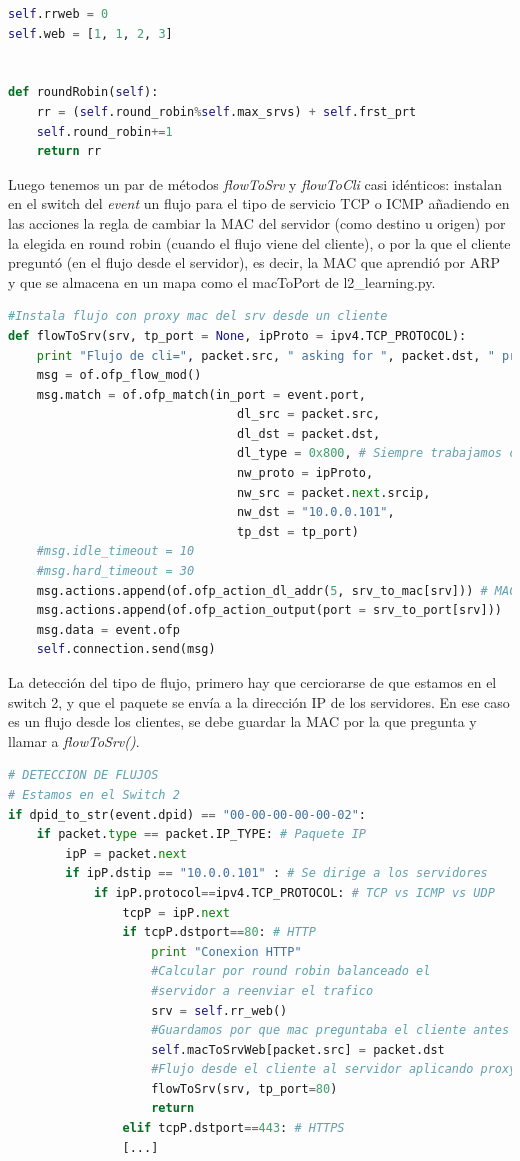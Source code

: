 \documentclass{article}
\begin{document}
\begin{lstlisting}[language=Python]
self.rrweb = 0
self.web = [1, 1, 2, 3]


def roundRobin(self):
	rr = (self.round_robin%self.max_srvs) + self.frst_prt
	self.round_robin+=1
	return rr
\end{lstlisting}


Luego tenemos un par de métodos \textit{flowToSrv} y \textit{flowToCli} casi idénticos: instalan en el switch del \textit{event} un flujo para el tipo de servicio TCP o ICMP añadiendo en las acciones la regla de cambiar la MAC del servidor (como destino u origen) por la elegida en round robin (cuando el flujo viene del cliente), o por la que el cliente preguntó (en el flujo desde el servidor), es decir, la MAC que aprendió por ARP y que se almacena en un mapa como el macToPort de l2\_learning.py.

\begin{lstlisting}[language=Python]
#Instala flujo con proxy mac del srv desde un cliente
def flowToSrv(srv, tp_port = None, ipProto = ipv4.TCP_PROTOCOL):
	print "Flujo de cli=", packet.src, " asking for ", packet.dst, " proxy a srv=", srv
	msg = of.ofp_flow_mod()
	msg.match = of.ofp_match(in_port = event.port,
								dl_src = packet.src,
								dl_dst = packet.dst,
								dl_type = 0x800, # Siempre trabajamos con IP
								nw_proto = ipProto,
								nw_src = packet.next.srcip,
								nw_dst = "10.0.0.101",
								tp_dst = tp_port)
	#msg.idle_timeout = 10
	#msg.hard_timeout = 30
	msg.actions.append(of.ofp_action_dl_addr(5, srv_to_mac[srv])) # MAC PROXY
	msg.actions.append(of.ofp_action_output(port = srv_to_port[srv]))
	msg.data = event.ofp
	self.connection.send(msg)
\end{lstlisting}

La detección del tipo de flujo, primero hay que cerciorarse de que estamos en el switch 2, y que el paquete se envía a la dirección IP de los servidores. En ese caso es un flujo desde los clientes, se debe guardar la MAC por la que pregunta y llamar a \textit{flowToSrv()}.

\begin{lstlisting}[language=Python]
# DETECCION DE FLUJOS
# Estamos en el Switch 2
if dpid_to_str(event.dpid) == "00-00-00-00-00-02":
	if packet.type == packet.IP_TYPE: # Paquete IP
		ipP = packet.next
		if ipP.dstip == "10.0.0.101" : # Se dirige a los servidores
			if ipP.protocol==ipv4.TCP_PROTOCOL: # TCP vs ICMP vs UDP
				tcpP = ipP.next
				if tcpP.dstport==80: # HTTP
					print "Conexion HTTP"
					#Calcular por round robin balanceado el 
					#servidor a reenviar el trafico
					srv = self.rr_web()
					#Guardamos por que mac preguntaba el cliente antes de aplicar proxy
					self.macToSrvWeb[packet.src] = packet.dst
					#Flujo desde el cliente al servidor aplicando proxy mac del srv
					flowToSrv(srv, tp_port=80)
					return
				elif tcpP.dstport==443: # HTTPS
				[...]
\end{lstlisting}
\end{document}
